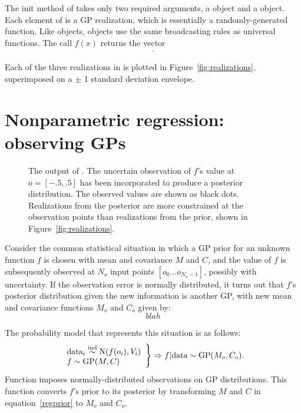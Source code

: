 \documentclass[article]{jss}
\begin{document}
The init method of  takes only two required arguments, a  object and a  object. Each element of  is a GP realization, which is essentially a randomly-generated  function. Like  objects,  objects use the same broadcasting rules as  universal functions. The call $f(x)$ returns the vector
\begin{eqnarray*}
    [f(x_0)\ldots f(x_{N_x-1})].
\end{eqnarray*}

Each of the three realizations in  is plotted in Figure~\ref{fig:realizations}, superimposed on a $\pm$ 1 standard deviation envelope.


\section{Nonparametric regression: observing GPs}\label{sec:observing}

\begin{figure}
    \centering
    \caption{The output of . The uncertain observation of $f$'s value at $o=[-.5,.5]$ has been incorporated to produce a posterior distribution. The observed values are shown as black dots. Realizations from the posterior are more constrained at the observation points than realizations from the prior, shown in Figure~\ref{fig:realizations}.}
    \label{fig:obs}
\end{figure}

Consider the common statistical situation in which a GP prior for an unknown function $f$ is chosen with mean and covariance $M$ and $C$, and the value of $f$ is subsequently observed at $N_o$ input points $[o_0\ldots o_{N_o-1}]$, possibly with uncertainty. If the observation error is normally distributed, it turns out that $f$'s posterior distribution given the new information is another GP, with new mean and covariance functions $M_o$ and $C_o$ given by:
\begin{equation}
    \label{eq:obs-formula}
    blah 
\end{equation}

The probability model that represents this situation is as follows:
\begin{equation}
    \label{regprior}
    \left.\begin{array}{l}
        \textup{data}_i \stackrel{\tiny{\textup{ind}}}{\sim} \textup{N}(f(o_i), V_i)\\
        f \sim \textup{GP}(M,C)\\
    \end{array}\right\}\Rightarrow f|\textup{data} \sim \textup{GP}(M_o, C_o).
\end{equation}
Function  imposes normally-distributed observations on GP distributions. This function converts $f$'s prior to its posterior by transforming $M$ and $C$ in equation~\ref{regprior} to $M_o$ and $C_o$.
\end{document}
